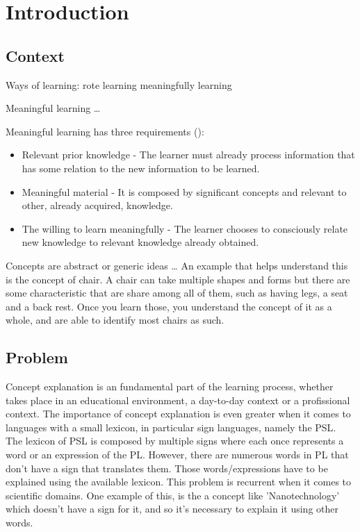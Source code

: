 % 
\chapter{Introduction} %
\label{chap:Chapter1} %

\section{Context}

Ways of learning: rote learning meaningfully learning

Meaningful learning \dots

Meaningful learning has three requirements (\cite{novak_2012}): 

\begin{itemize}
    \item Relevant prior knowledge - The learner must already process information that has some relation to the new information to be learned.
    \item Meaningful material - It is composed by significant concepts and relevant to other, already acquired, knowledge.
    \item The willing to learn meaningfully - The learner chooses to consciously relate new knowledge to relevant knowledge already obtained.
\end{itemize}

Concepts are abstract or generic ideas \dots
An example that helps understand this is the concept of chair.
A chair can take multiple shapes and forms but there are some characteristic that are share among all of them, such as having legs, a seat and a back rest.
Once you learn those, you understand the concept of it as a whole, and are able to identify most chairs as such.

\section{Problem}

Concept explanation is an fundamental part of the learning process, whether takes place in an educational environment, a day-to-day context or a profissional context.
The importance of concept explanation is even greater when it comes to languages with a small lexicon, in particular sign languages, namely the \gls{PSL}.
The lexicon of \gls{PSL} is composed by multiple signs where each once represents a word or an expression of the \gls{PL}.
However, there are numerous words in \gls{PL} that don't have a sign that translates them.
Those words/expressions have to be explained using the available lexicon.
This problem is recurrent when it comes to scientific domains.
One example of this, is the a concept like 'Nanotechnology' which doesn't have a sign for it, and so it's necessary to explain it using other words.


